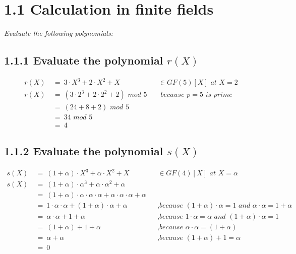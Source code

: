 \documentclass{article}
\begin{document}
	\pagestyle{fancy}
	\hfill
	
	\section*{1.1 Calculation in finite fields}
	\begin{adjustwidth}{2em}{2em}
		\textit{Evaluate the following polynomials:}
		\subsection*{1.1.1 Evaluate the polynomial $r(X)$}
		\begin{align*}
			r(X) \ & = \ 3 \cdot X^3 + 2 \cdot X^2 + X & & \in GF(5)[X] \textit{ at } X = 2 \\
			r(X) \ & = \ (3 \cdot 2^3 + 2 \cdot 2^2 + 2) \textit{ mod } 5 & & \textit{ because } p = 5 \textit{ is prime} \\
			& = \ (24 + 8 + 2) \textit{ mod } 5 \\
			& = \ 34 \textit{ mod } 5 \\
			& = \ 4				
		\end{align*}
		\subsection*{1.1.2 Evaluate the polynomial $s(X)$}
		\begin{align*}
			s(X) \ & = \ (1+\alpha) \cdot X^3 + \alpha \cdot X^2 + X & & \in GF(4)[X] \textit{ at } X = \alpha \\
			s(X) \ & = \ (1+\alpha) \cdot \alpha^3 + \alpha \cdot \alpha^2 + \alpha \\
			& = \ (1+\alpha) \cdot \alpha \cdot \alpha \cdot \alpha + \alpha \cdot \alpha \cdot \alpha + \alpha \\
			& = \ 1 \cdot \alpha \cdot \alpha + (1 + \alpha) \cdot \alpha + \alpha & & \textit{,because } (1+\alpha) \cdot \alpha = 1 \textit{ and } \alpha \cdot \alpha = 1 + \alpha \\
			& = \ \alpha \cdot \alpha + 1 + \alpha & & \textit{,because } 1 \cdot \alpha = \alpha \textit{ and } (1 + \alpha) \cdot \alpha = 1 \\
			& = \ (1 + \alpha) + 1 + \alpha & & \textit{,because } \alpha \cdot \alpha = (1+\alpha) \\
			& = \ \alpha + \alpha & & \textit{,because } (1+\alpha) + 1 = \alpha \\
			& = \ 0
		\end{align*}
	\end{adjustwidth}
	
\end{document}
